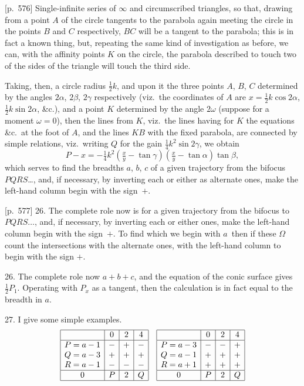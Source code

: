 \documentclass[11pt,a4paper]{book}
\begin{document}
[p.~576] Single-infinite series of $\infty$ and circumscribed triangles, so that, drawing from a point $A$ of the circle tangents to the parabola again meeting the circle in the points $B$ and $C$ respectively, $BC$ will be a tangent to the parabola; this is in fact a known thing, but, repeating the same kind of investigation as before, we can, with the affinity points $K$ on the circle, the parabola described to touch two of the sides of the triangle will touch the third side.

Taking, then, a circle radius $\frac{1}{2}k$, and upon it the three points $A$, $B$, $C$ determined by the angles $2\alpha$, $2\beta$, $2\gamma$ respectively (viz.\ the coordinates of $A$ are $x = \frac{1}{2}k\cos 2\alpha$, $\frac{1}{2}k\sin 2\alpha$, \&c.), and a point $K$ determined by the angle $2\omega$ (suppose for a moment $\omega = 0$), then the lines from $K$, viz.\ the lines having for $K$ the equations \&c.\ at the foot of $A$, and the lines $KB$ with the fixed parabola, are connected by simple relations, viz.\ writing $Q$ for the gain $\frac{1}{4}k^2 \sin 2\gamma$, we obtain
\[
P - x = -\tfrac{1}{4}k^2 \left( \tfrac{x}{y} - \tan \gamma \right) \left(\tfrac{x}{y} - \tan \alpha\right) \tan \beta,
\]
which serves to find the breadths $a$, $b$, $c$ of a given trajectory from the bifocus $PQRS$\ldots, and, if necessary, by inverting each or either as alternate ones, make the left-hand column begin with the sign~$+$.

[p.~577] 26. The complete role now is for a given trajectory from the bifocus to $PQRS\ldots$, and, if necessary, by inverting each or either ones, make the left-hand column begin with the sign~$+$. To find which we begin with $a$~then if these $\Omega$ count the intersections with the alternate ones, with the left-hand column to begin with the sign $+$.

26. The complete role now $a + b + c$, and the equation of the conic surface gives $\tfrac{1}{2} P_1$. Operating with $P_x$ as a tangent, then the calculation is in fact equal to the breadth in $a$.

27. I give some simple examples.
\[
\begin{array}{|c|c|c|c|}
\hline
 & 0 & 2 & 4 \\
\hline
P = a - 1 & - & + & - \\
Q = a - 3 & + & + & + \\
R = a - 1 & - & - & - \\
\hline
0 & P & 2 & Q \\
\hline
\end{array}
\quad
\begin{array}{|c|c|c|c|}
\hline
 & 0 & 2 & 4 \\
\hline
P = a - 3 & - & - & + \\
Q = a - 1 & + & + & + \\
R = a + 1 & + & + & + \\
\hline
0 & P & 2 & Q \\
\hline
\end{array}
\]
\end{document}
